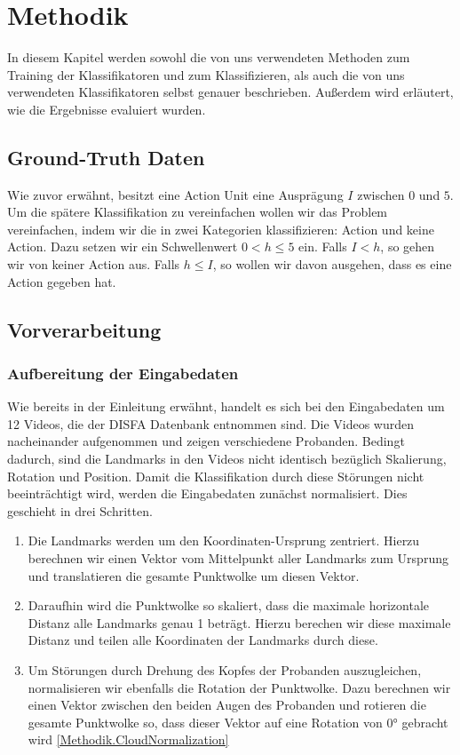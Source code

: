 \chapter{Methodik}
In diesem Kapitel werden sowohl die von uns verwendeten Methoden zum Training der Klassifikatoren und zum Klassifizieren,
als auch die von uns verwendeten Klassifikatoren selbst genauer beschrieben. Außerdem wird erläutert, wie die Ergebnisse
evaluiert wurden.

\section{Ground-Truth Daten}
Wie zuvor erwähnt, besitzt eine Action Unit eine Ausprägung $I$ zwischen $0$ und $5$. Um die spätere Klassifikation zu vereinfachen wollen wir das Problem vereinfachen, indem wir die in zwei Kategorien klassifizieren: Action und keine Action. Dazu setzen wir ein Schwellenwert $0<h\leq5$ ein. Falls $I<h$, so gehen wir von keiner Action aus. Falls $h\leq I$, so wollen wir davon ausgehen, dass es eine Action gegeben hat.
\section{Vorverarbeitung}
\subsection{Aufbereitung der Eingabedaten}
Wie bereits in der Einleitung erwähnt, handelt es sich bei den Eingabedaten um 12 Videos, die der DISFA Datenbank entnommen sind.
Die Videos wurden nacheinander aufgenommen und zeigen verschiedene Probanden. Bedingt dadurch, sind die Landmarks
in den Videos nicht identisch bezüglich Skalierung, Rotation und Position.\newline
Damit die Klassifikation durch diese Störungen nicht beeinträchtigt wird, werden die Eingabedaten zunächst normalisiert. Dies geschieht
in drei Schritten.
\begin{enumerate}
  \item Die Landmarks werden um den Koordinaten-Ursprung zentriert. Hierzu berechnen wir einen Vektor vom Mittelpunkt aller Landmarks zum Ursprung und translatieren
        die gesamte Punktwolke um diesen Vektor.
  \item Daraufhin wird die Punktwolke so skaliert, dass die maximale horizontale Distanz alle Landmarks genau 1 beträgt. Hierzu berechen wir diese maximale Distanz und
        teilen alle Koordinaten der Landmarks durch diese.
  \item Um Störungen durch Drehung des Kopfes der Probanden auszugleichen, normalisieren wir ebenfalls die Rotation der Punktwolke. Dazu berechnen wir einen Vektor
        zwischen den beiden Augen des Probanden und rotieren die gesamte Punktwolke so, dass dieser Vektor auf eine Rotation von 0° gebracht wird \ref{Methodik.CloudNormalization}
\end{enumerate}
\label{Methodik.CloudNormalization}


